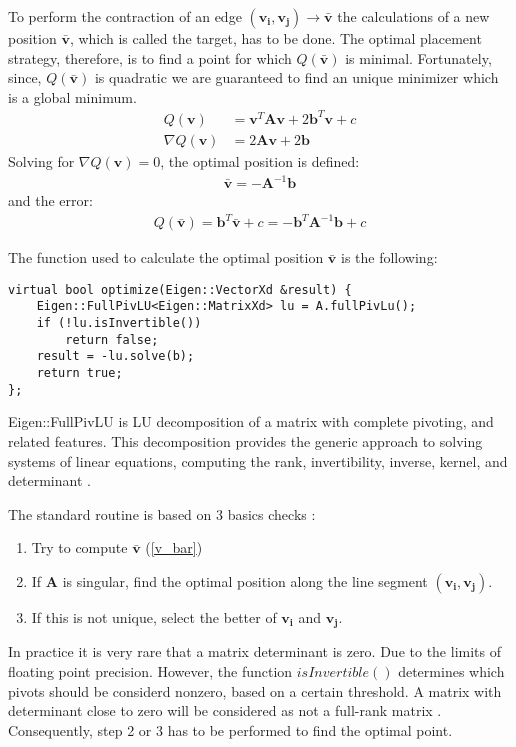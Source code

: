 To perform the contraction of an edge $(\mathbf{v_i}, \mathbf{v_j})\rightarrow\bar{\mathbf{v}}$ the calculations of a new position $\mathbf{\bar{v}}$, which is called the target, has to be done. The optimal placement strategy, therefore, is to find a point for which $Q(\mathbf{\bar{v}})$ is minimal. Fortunately, since, $Q(\mathbf{\bar{v}})$ is quadratic we are guaranteed to find an unique minimizer which is a global minimum.
\begin{align}
Q(\mathbf{v}) &= \mathbf{v}^T\mathbf{A}\mathbf{v} + 2\mathbf{b}^T\mathbf{v} + c\\
\nabla Q(\mathbf{v}) &= 2\mathbf{A}\mathbf{v} + 2 \mathbf{b}
\end{align}
Solving for $\nabla Q(\mathbf{v}) = 0$, the optimal position is defined:
\begin{align}
\mathbf{\bar{v}} = -\mathbf{A}^{-1}\mathbf{b}
\label{v_bar}
\end{align}
and the error:
\begin{align}
Q(\mathbf{\bar{v}}) = \mathbf{b}^T\mathbf{\bar{v}} + c = -\mathbf{b}^T\mathbf{A}^{-1}\mathbf{b} + c
\end{align}

The function used to calculate the optimal position $\mathbf{\bar{v}}$ is the following:
\begin{center}
\begin{lstlisting}[caption={LU decomposition for solving a linear system.},captionpos=b]
virtual bool optimize(Eigen::VectorXd &result) {
	Eigen::FullPivLU<Eigen::MatrixXd> lu = A.fullPivLu();
	if (!lu.isInvertible())
		return false;
	result = -lu.solve(b);
	return true;
};
\end{lstlisting}
\end{center}
Eigen::FullPivLU is LU decomposition of a matrix with complete pivoting, and related features. This decomposition provides the generic approach to solving systems of linear equations, computing the rank, invertibility, inverse, kernel, and determinant \cite{eigenLU19}.

The standard routine is based on 3 basics checks \cite{garland99}:
\begin{enumerate}
\item Try to compute $\mathbf{\bar{v}}$ (\ref{v_bar})
\item If $\mathbf{A}$ is singular, find the optimal position along the line segment $(\mathbf{v_i}, \mathbf{v_j})$.
\item If this is not unique, select the better of $\mathbf{v_i}$ and $ \mathbf{v_j}$.
\end{enumerate}
In practice it is very rare that a matrix determinant is zero. Due to the limits of floating point precision. However, the function $isInvertible()$ determines which pivots should be considerd nonzero, based on a certain threshold. A matrix with determinant close to zero will be considered as not a full-rank matrix \cite{strang88}. Consequently, step 2 or 3 has to be performed to find the optimal point.

